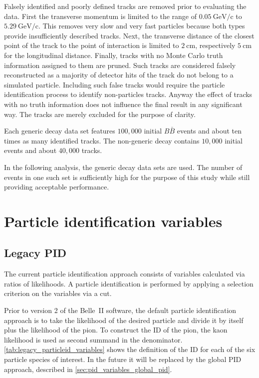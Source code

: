 Falsely identified and poorly defined tracks are removed prior to evaluating the data. First the transverse momentum is limited to the range of $0.05 \mathrm{~GeV/c}$ to $5.29 \mathrm{~GeV/c}$. This removes very slow and very fast particles because both types provide insufficiently described tracks. Next, the transverse distance of the closest point of the track to the point of interaction is limited to $2 \mathrm{~cm}$, respectively $5 \mathrm{~cm}$ for the longitudinal distance. Finally, tracks with no Monte Carlo truth information assigned to them are pruned. Such tracks are considered falsely reconstructed as a majority of detector hits of the track do not belong to a simulated particle. Including such false tracks would require the particle identification process to identify non-particles tracks. Anyway the effect of tracks with no truth information does not influence the final result in any significant way. The tracks are merely excluded for the purpose of clarity.

Each generic decay data set features $100,000$ initial $B \bar{B}$ events and about ten times as many identified tracks. The non-generic decay contains $10,000$ initial events and about $40,000$ tracks.

In the following analysis, the generic decay data sets are used. The number of events in one such set is sufficiently high for the purpose of this study while still providing acceptable performance.

\section{Particle identification variables}
\label{sec:pid_variables}

\subsection{Legacy PID}
\label{sec:pid_variables_legacy_pid}

The current particle identification approach consists of variables calculated via ratios of likelihoods. A particle identification is performed by applying a selection criterion on the variables via a cut.

Prior to version 2 of the Belle~\RN{2} software, the default particle identification approach is to take the likelihood of the desired particle and divide it by itself plus the likelihood of the pion. To construct the ID of the pion, the kaon likelihood is used as second summand in the denominator. \autoref{tab:legacy_particleid_variables} shows the definition of the ID for each of the six particle species of interest. In the future it will be replaced by the global PID approach, described in \autoref{sec:pid_variables_global_pid}.

